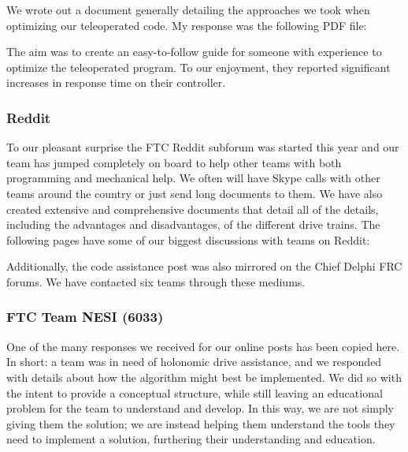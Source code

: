 We wrote out a document generally detailing the approaches we took when optimizing our teleoperated code. My response was the following PDF file:



The aim was to create an easy-to-follow guide for someone with experience to optimize the teleoperated program. To our enjoyment, they reported significant increases in response time on their controller.

\subsubsection{Reddit}
To our pleasant surprise the FTC Reddit subforum was started this year and our team has jumped completely on board to help other teams with both programming and mechanical help. We often will have Skype calls with other teams around the country or just send long documents to them. We have also created extensive and comprehensive documents that detail all of the details, including the advantages and disadvantages, of the different drive trains. The following pages have some of our biggest discussions with teams on Reddit:





Additionally, the code assistance post was also mirrored on the Chief Delphi FRC forums. We have contacted six teams through these mediums. 

\subsubsection{FTC Team NESI (6033)}

One of the many responses we received for our online posts has been copied here. In short: a team was in need of holonomic drive assistance, and we responded with details about how the algorithm might best be implemented. We did so with the intent to provide a conceptual structure, while still leaving an educational problem for the team to understand and develop. In this way, we are not simply giving them the solution; we are instead helping them understand the tools they need to implement a solution, furthering their understanding and education.

